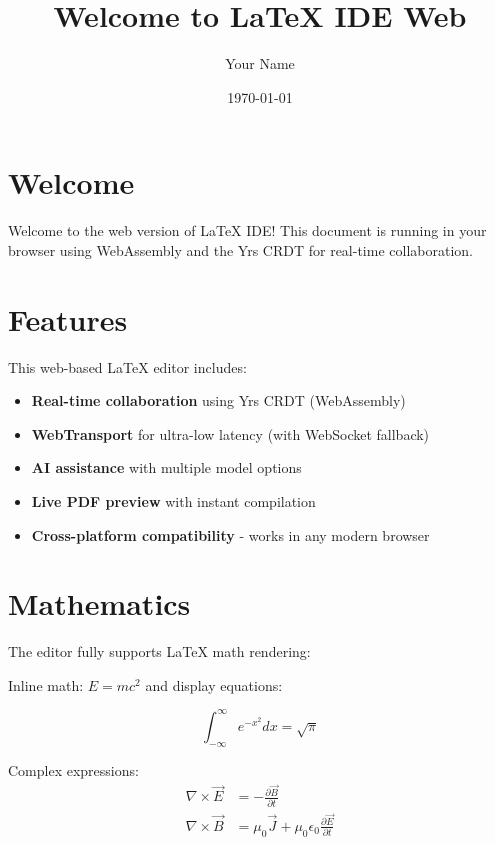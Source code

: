 \documentclass{article}
\title{Welcome to LaTeX IDE Web}
\author{Your Name}
\date{\today}
\begin{document}
\maketitle

\section{Welcome}

Welcome to the web version of LaTeX IDE! This document is running in your browser using WebAssembly and the Yrs CRDT for real-time collaboration.

\section{Features}

This web-based LaTeX editor includes:

\begin{itemize}
    \item \textbf{Real-time collaboration} using Yrs CRDT (WebAssembly)
    \item \textbf{WebTransport} for ultra-low latency (with WebSocket fallback)
    \item \textbf{AI assistance} with multiple model options
    \item \textbf{Live PDF preview} with instant compilation
    \item \textbf{Cross-platform compatibility} - works in any modern browser
\end{itemize}

\section{Mathematics}

The editor fully supports LaTeX math rendering:

Inline math: $E = mc^2$ and display equations:

\begin{equation}
    \int_{-\infty}^{\infty} e^{-x^2} dx = \sqrt{\pi}
\end{equation}

Complex expressions:
\begin{align}
    \nabla \times \vec{E} &= -\frac{\partial \vec{B}}{\partial t} \\
    \nabla \times \vec{B} &= \mu_0 \vec{J} + \mu_0 \epsilon_0 \frac{\partial \vec{E}}{\partial t}
\end{align}
\end{document}
